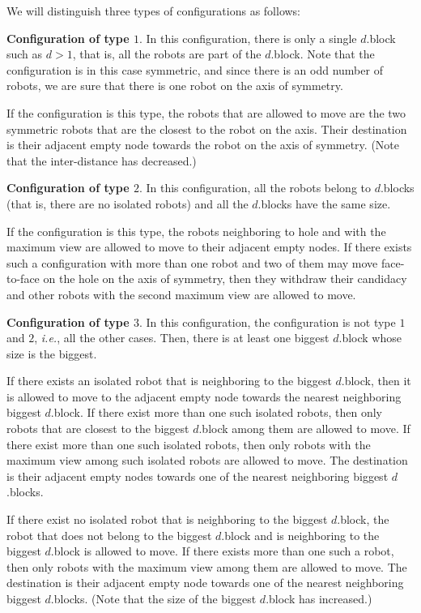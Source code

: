 \documentclass[11pt]{article}
\begin{document}
We will distinguish three types of configurations as follows:
\begin{itemize*}
\item \textbf{Configuration of type $1$}.
In this configuration, there is only a single $d$.block such as $d > 1$, that is, all the robots are part of the $d$.block. 
Note that the configuration is in this case symmetric, and since there is an odd number of robots, we are sure that there is one robot on the axis of symmetry.

If the configuration is this type, the robots that are allowed to move are the two symmetric robots that are the closest to the robot on the axis. 
Their destination is their adjacent empty node towards the robot on the axis of symmetry.
(Note that the inter-distance has decreased.)

\item \textbf{Configuration of type $2$}.
In this configuration, all the robots belong to $d$.blocks (that is, there are no isolated robots) and all the $d$.blocks have the same size.

If the configuration is this type, the robots neighboring to hole and with the maximum view are allowed to move to their adjacent empty nodes.
If there exists such a configuration with more than one robot and two of them may move face-to-face on the hole on the axis of symmetry, then they withdraw their candidacy and other robots with the second maximum view are allowed to move.

\item \textbf{Configuration of type $3$}.
In this configuration, the configuration is not type $1$ and $2$, \textit{i.e.}, all the other cases.
Then, there is at least one biggest $d$.block whose size is the biggest.

\begin{itemize*}
 \item If there exists an isolated robot that is neighboring to the biggest $d$.block, then it is allowed to move to the adjacent empty node towards the nearest neighboring biggest $d$.block. 
 If there exist more than one such isolated robots, then only robots that are closest to the biggest $d$.block among them are allowed to move.
 If there exist more than one such isolated robots, then only robots with the maximum view among such isolated robots are allowed to move.
The destination is their adjacent empty nodes towards one of the nearest neighboring biggest $d$.blocks.
\item If there exist no isolated robot that is neighboring to the biggest $d$.block, the robot that does not belong to the biggest $d$.block and is neighboring to the biggest $d$.block is allowed to move.
If there exists more than one such a robot, then only robots with the maximum view among them are allowed to move.
The destination is their adjacent empty node towards one of the nearest neighboring biggest $d$.blocks.
(Note that the size of the biggest $d$.block has increased.)\end{itemize*}
\end{itemize*} 
\end{document}
